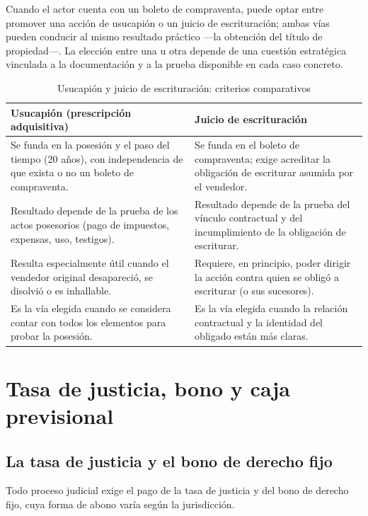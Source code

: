 \documentclass[12pt,oneside]{book}
\begin{document}
Cuando el actor cuenta con un boleto de compraventa, puede optar entre promover una acción de usucapión o un juicio de escrituración; ambas vías pueden conducir al mismo resultado práctico —la obtención del título de propiedad—. La elección entre una u otra depende de una cuestión estratégica vinculada a la documentación y a la prueba disponible en cada caso concreto.

\begin{table}[H]
\centering
\caption{Usucapión y juicio de escrituración: criterios comparativos}
\begin{tabularx}{\textwidth}{X X}
\toprule
\textbf{Usucapión (prescripción adquisitiva)} & \textbf{Juicio de escrituración} \\
\midrule
Se funda en la posesión y el paso del tiempo (20 años), con independencia de que exista o no un boleto de compraventa. &
Se funda en el boleto de compraventa; exige acreditar la obligación de escriturar asumida por el vendedor. \\
\addlinespace
Resultado depende de la prueba de los actos posesorios (pago de impuestos, expensas, uso, testigos). &
Resultado depende de la prueba del vínculo contractual y del incumplimiento de la obligación de escriturar. \\
\addlinespace
Resulta especialmente útil cuando el vendedor original desapareció, se disolvió o es inhallable. &
Requiere, en principio, poder dirigir la acción contra quien se obligó a escriturar (o sus sucesores). \\
\addlinespace
Es la vía elegida cuando se considera contar con todos los elementos para probar la posesión. &
Es la vía elegida cuando la relación contractual y la identidad del obligado están más claras. \\
\bottomrule
\end{tabularx}
\end{table}

\section{Tasa de justicia, bono y caja previsional}

\subsection{La tasa de justicia y el bono de derecho fijo}

Todo proceso judicial exige el pago de la tasa de justicia y del bono de derecho fijo, cuya forma de abono varía según la jurisdicción.
\end{document}
